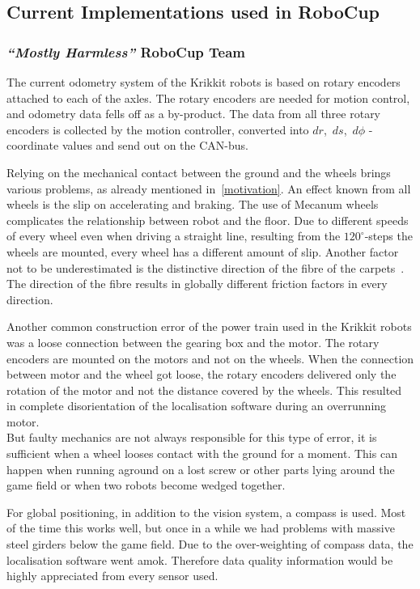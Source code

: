 \documentclass[12pt,a4paper]{article}
\newcommand{\MH}{\emph{``Mostly Harmless''} RoboCup Team\xspace}
\begin{document}
\subsection{Current Implementations used in RoboCup}

\subsubsection{\MH}

The current odometry system of the Krikkit robots is based on rotary encoders attached to each of the axles. 
The rotary encoders are needed for motion control, and odometry data fells off as a by-product.
The data from all three rotary encoders is collected by the motion controller, converted into $dr$,~$ds$,~$d\phi$ - coordinate values and send out on the CAN-bus.

Relying on the mechanical contact between the ground and the wheels brings various problems, as already mentioned in~\autoref{motivation}.
An effect known from all wheels is the slip on accelerating and braking.
The use of Mecanum wheels complicates the relationship between robot and the floor.
Due to different speeds of every wheel even when driving a straight line, resulting from the $120^\circ$\mbox{-}steps the wheels are mounted, every wheel has a different amount of slip.
Another factor not to be underestimated is the distinctive direction of the fibre of the carpets~\cite{mecanum2007}.
The direction of the fibre results in globally different friction factors in every direction.

Another common construction error of the power train used in the Krikkit robots was a loose connection between the gearing box and the motor.
The rotary encoders are mounted on the motors and not on the wheels.
When the connection between motor and the wheel got loose, the rotary encoders delivered only the rotation of the motor and not the distance covered by the wheels. 
This resulted in complete disorientation of the localisation software during an overrunning motor.\\
But faulty mechanics are not always responsible for this type of error, it is sufficient when a wheel looses contact with the ground for a moment.
This can happen when running aground on a lost screw or other parts lying around the game field or when two robots become wedged together.

For global positioning, in addition to the vision system, a compass is used.
Most of the time this works well, but once in a while we had problems with massive steel girders below the game field.
Due to the over-weighting of compass data, the localisation software went amok.
Therefore data quality information would be highly appreciated from every sensor used.
\end{document}
